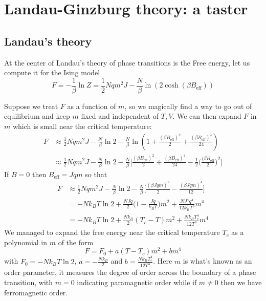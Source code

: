 \documentclass[a4paper,11pt,oneside]{book}
\begin{document}
\section{Landau-Ginzburg theory: a taster}
\subsection*{Landau's theory}
At the center of Landau's theory of phase transitions is the Free energy, let us compute it for the Ising model
\begin{equation}
    F=-\frac{1}{\beta} \ln Z=\frac{1}{2} N qm^2J-\frac{N}{\beta}\ln (2\cosh(\beta B_{\text{eff}}))
\end{equation}

Suppose we treat $F$ as a function of $m$, so we magically find a way to go out of equilibrium and keep $m$ fixed and independent of $T,V$. We can then expand $F$ in $m$ which is small near the critical temperature:
\begin{align}
    F &\approx \frac{1}{2}Nqm^2J - \frac{N}{\beta}\ln 2-\frac{N}{\beta} \ln(1+\frac{(\beta B_{\text{eff}})^2}{2}+\frac{(\beta B_{\text{eff}})^4}{24})\\
    &\approx \frac{1}{2}Nqm^2J - \frac{N}{\beta}\ln 2-\frac{N}{\beta}\bigg[\frac{(\beta B_{\text{eff}})^2}{2}+\frac{(\beta B_{\text{eff}})^4}{24}-\frac{1}{2}\bigg(\frac{(\beta B_{\text{eff}}}{2}\bigg)^2\bigg]
\end{align}
If $B=0$ then $B_{\text{eff}} = Jqm$ so that
\begin{align}
    F &\approx \frac{1}{2}Nqm^2J - \frac{N}{\beta}\ln 2-\frac{N}{\beta}\bigg[\frac{(\beta Jqm)^2}{2}-\frac{(\beta Jqm)^4}{12}\bigg]\\
    &=-Nk_B T \ln 2 +\frac{NJq}{2}\bigg(1-\frac{Jq}{k_BT}\bigg) m^2 + \frac{NJ^4q^4}{12k_B^3T^3}m^4\\
    &=-Nk_B T \ln 2 +\frac{Nk_B}{2}(T_c-T) m^2 + \frac{Nk_BT_c^4}{12T^3}m^4
\end{align}
We managed to expand the free energy near the critical temperature $T_c$ as a polynomial in $m$ of the form
\begin{equation}
    F =F_0 + a(T-T_c)m^2+bm^4
\end{equation}
with $F_0 = -Nk_B T \ln 2$, $a =-\frac{Nk_B}{2}$ and $b = \frac{Nk_BT_c^4}{12T^3}$. Here $m$ is what's known as an order parameter, it measures the degree of order across the boundary of a phase transition, with $m=0$ indicating paramagnetic order while if $m\neq0$ then we have ferromagnetic order.
\end{document}
